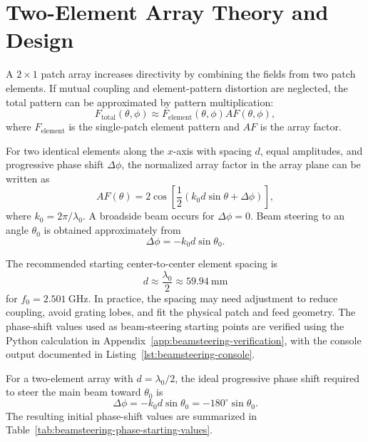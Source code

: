 \section{Two-Element Array Theory and Design}
\label{sec:array-theory-design}

A \(2\times1\) patch array increases directivity by combining the fields from two patch elements.
If mutual coupling and element-pattern distortion are neglected, the total pattern can be approximated
by pattern multiplication:
\[
F_{\mathrm{total}}(\theta,\phi)
\approx
F_{\mathrm{element}}(\theta,\phi)AF(\theta,\phi),
\]
where \(F_{\mathrm{element}}\) is the single-patch element pattern and \(AF\) is the array factor.

For two identical elements along the \(x\)-axis with spacing \(d\), equal amplitudes, and progressive
phase shift \(\Delta\phi\), the normalized array factor in the array plane can be written as
\[
AF(\theta)
=
2\cos\left[\frac{1}{2}\left(k_0 d\sin\theta+\Delta\phi\right)\right],
\]
where \(k_0=2\pi/\lambda_0\). A broadside beam occurs for \(\Delta\phi=0\). Beam steering to
an angle \(\theta_0\) is obtained approximately from
\[
\boxed{\Delta\phi=-k_0 d\sin\theta_0.}
\]

The recommended starting center-to-center element spacing is
\[
d\approx\frac{\lambda_0}{2}\approx59.94~\mathrm{mm}
\]
for \(f_0=2.501~\mathrm{GHz}\). In practice, the spacing may need adjustment to reduce coupling,
avoid grating lobes, and fit the physical patch and feed geometry. The phase-shift values used as
beam-steering starting points are verified using the Python calculation in
Appendix~\ref{app:beamsteering-verification}, with the console output documented in
Listing~\ref{lst:beamsteering-console}.


For a two-element array with \(d=\lambda_0/2\), the ideal progressive phase shift required to steer the main beam toward \(\theta_0\) is
\[
\Delta\phi = -k_0 d \sin\theta_0 = -180^\circ \sin\theta_0 .
\]
The resulting initial phase-shift values are summarized in Table~\ref{tab:beamsteering-phase-starting-values}.

